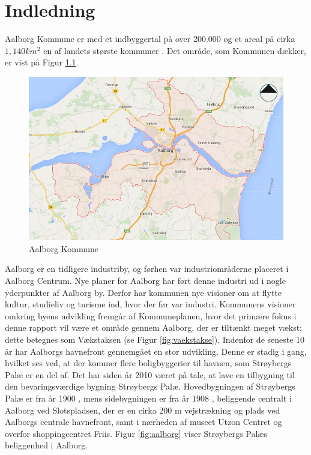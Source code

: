 \chapter{Indledning}
Aalborg Kommune er med et indbyggertal på over 200.000 og et areal på cirka  $1,\!140 km^2$ en af landets største kommuner \citep{kommunedata}. Det område, som Kommunen dækker, er vist på Figur \ref{fig:aalborgkommune}. 

\begin{figure}[htbp]
	\includegraphics[width=1.0\textwidth]{billeder/aalborgkommune.png}
	\caption{Aalborg Kommune}
	\label{fig:aalborgkommune}
\end{figure}

\indent{     }  Aalborg er en tidligere industriby, og førhen var industriområderne placeret i Aalborg Centrum. Nye planer for Aalborg har ført denne industri ud i nogle yderpunkter af Aalborg by. Derfor har kommunen nye visioner om at flytte kultur, studieliv og turisme ind, hvor der før var industri. Kommunens visioner omkring byens udvikling fremgår af Kommuneplanen, hvor det primære fokus i denne rapport vil være et område gennem Aalborg, der er tiltænkt meget vækst; dette betegnes som Vækstaksen (se Figur \ref{fig:vaekstakse}).
\newline \indent{     }  Indenfor de seneste 10 år har Aalborgs havnefront gennemgået en stor udvikling. Denne er stadig i gang, hvilket ses ved, at der kommer flere boligbyggerier til havnen, som Strøybergs Palæ er en del af. 
\newline \indent{     }  Det har siden år 2010 været på tale, at lave en tilbygning til den bevaringsværdige bygning Strøybergs Palæ. Hovedbygningen af Strøybergs Palæ er fra år 1900 \citep{hovedbygning}, mens sidebygningen er fra år 1908 \citep{sidebygning}, beliggende centralt i Aalborg ved Slotspladsen, der er en cirka 200 m vejstrækning og plads ved Aalborgs centrale havnefront, samt i nærheden af museet Utzon Centret og overfor shoppingcentret Friis. Figur \ref{fig:aalborg} viser Strøybergs Palæs beliggenhed i Aalborg. 

